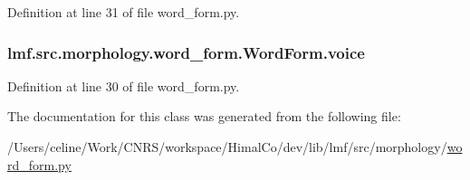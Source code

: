 Definition at line 31 of file word\+\_\+form.\+py.

\hypertarget{classlmf_1_1src_1_1morphology_1_1word__form_1_1_word_form_ac08b72f6837815d9d11d3cb0a36ed932}{
\subsubsection[{voice}]{\setlength{\rightskip}{0pt plus 5cm}lmf.\+src.\+morphology.\+word\+\_\+form.\+Word\+Form.\+voice}}\label{classlmf_1_1src_1_1morphology_1_1word__form_1_1_word_form_ac08b72f6837815d9d11d3cb0a36ed932}


Definition at line 30 of file word\+\_\+form.\+py.



The documentation for this class was generated from the following file\+:\begin{DoxyCompactItemize}
\item 
/\+Users/celine/\+Work/\+C\+N\+R\+S/workspace/\+Himal\+Co/dev/lib/lmf/src/morphology/\hyperlink{word__form_8py}{word\+\_\+form.\+py}\end{DoxyCompactItemize}
